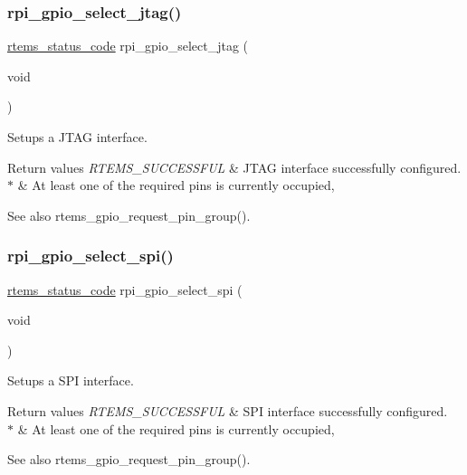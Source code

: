 \subsubsection{\texorpdfstring{rpi\_gpio\_select\_jtag()}{rpi\_gpio\_select\_jtag()}}
{\footnotesize\ttfamily \mbox{\hyperlink{group__ClassicStatus_ga545d41846817eaba6143d52ee4d9e9fe}{rtems\+\_\+status\+\_\+code}} rpi\+\_\+gpio\+\_\+select\+\_\+jtag (\begin{DoxyParamCaption}\item[{void}]{ }\end{DoxyParamCaption})}



Setups a J\+T\+AG interface. 


\begin{DoxyRetVals}{Return values}
{\em R\+T\+E\+M\+S\+\_\+\+S\+U\+C\+C\+E\+S\+S\+F\+UL} & J\+T\+AG interface successfully configured. \\
\hline
{\em $\ast$} & At least one of the required pins is currently occupied, \\
\hline
\end{DoxyRetVals}
\begin{DoxySeeAlso}{See also}
rtems\+\_\+gpio\+\_\+request\+\_\+pin\+\_\+group(). 
\end{DoxySeeAlso}
\mbox{\label{rpi-gpio_8c_a2546c0dc5eb7c840fe712e9ac748e6a9}} 
\subsubsection{\texorpdfstring{rpi\_gpio\_select\_spi()}{rpi\_gpio\_select\_spi()}}
{\footnotesize\ttfamily \mbox{\hyperlink{group__ClassicStatus_ga545d41846817eaba6143d52ee4d9e9fe}{rtems\+\_\+status\+\_\+code}} rpi\+\_\+gpio\+\_\+select\+\_\+spi (\begin{DoxyParamCaption}\item[{void}]{ }\end{DoxyParamCaption})}



Setups a S\+PI interface. 


\begin{DoxyRetVals}{Return values}
{\em R\+T\+E\+M\+S\+\_\+\+S\+U\+C\+C\+E\+S\+S\+F\+UL} & S\+PI interface successfully configured. \\
\hline
{\em $\ast$} & At least one of the required pins is currently occupied, \\
\hline
\end{DoxyRetVals}
\begin{DoxySeeAlso}{See also}
rtems\+\_\+gpio\+\_\+request\+\_\+pin\+\_\+group(). 
\end{DoxySeeAlso}
\mbox{\label{rpi-gpio_8c_a592adea1ce8d2b73d8d0b02a6d4e0115}} 

